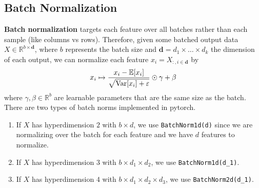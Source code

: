\subsection{Batch Normalization} 

  \begin{definition}
    \textbf{Batch normalization} targets each feature over all batches rather than each sample (like columns vs rows). Therefore, given some batched output data $X \in \mathbb{R}^{b \times \mathbf{d}}$, where $b$ represents the batch size and $\mathbf{d} = d_1 \times \ldots \times d_k$ the dimension of each output, we can normalize each feature $x_i = X_{:,i \in \mathbf{d}}$ by 
    \begin{equation}
      x_i \mapsto \frac{x_i - \mathbb{E}[x_i]}{\sqrt{\Var[x_i] + \varepsilon}} \odot \gamma + \beta
    \end{equation}
    where $\gamma, \beta \in \mathbb{R}^b$ are learnable parameters that are the same size as the batch. There are two types of batch norms implemented in pytorch. 
    \begin{enumerate}
      \item If $X$ has hyperdimension $2$ with $b \times d$, we use \texttt{BatchNorm1d(d)} since we are normalizing over the batch for each feature and we have $d$ features to normalize. 
      \item If $X$ has hyperdimension $3$ with $b \times d_1 \times d_2$, we use \texttt{BatchNorm1d(d\_1)}. 
      \item If $X$ has hyperdimension $4$ with $b \times d_1 \times d_2 \times d_3$, we use \texttt{BatchNorm2d(d\_1)}. 
    \end{enumerate}
  \end{definition}

